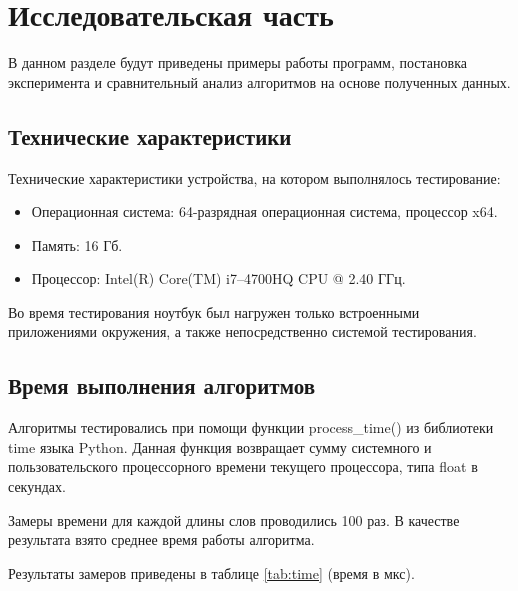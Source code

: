 \chapter{Исследовательская часть}

В данном разделе будут приведены примеры работы программ, постановка эксперимента и сравнительный анализ алгоритмов на основе полученных данных.

\section{Технические характеристики}

Технические характеристики устройства, на котором выполнялось тестирование:

\begin{itemize}
	\item Операционная система: 64-разрядная операционная система, процессор x64.
	\item Память: 16 Гб.
	\item Процессор: Intel(R) Core(TM) i7--4700HQ CPU @ 2.40 ГГц.
\end{itemize}

Во время тестирования ноутбук был нагружен только встроенными приложениями окружения, а также непосредственно системой тестирования.

\section{Время выполнения алгоритмов}

Алгоритмы тестировались при помощи функции process\_time() из библиотеки time языка Python. Данная функция возвращает сумму системного и пользовательского процессорного времени текущего процессора, типа float в секундах.

Замеры времени для каждой длины слов проводились 100 раз. В качестве результата взято среднее время работы алгоритма.

Результаты замеров приведены в таблице \ref{tab:time} (время в мкс).

